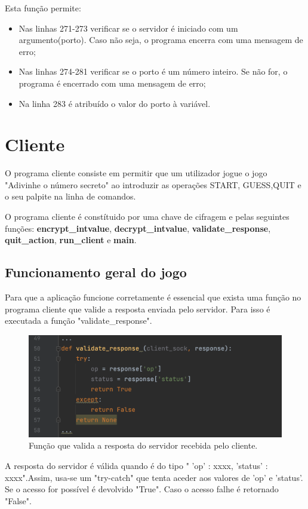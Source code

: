 \documentclass{report}
\begin{document}
Esta função permite:
\begin{itemize}
\item Nas linhas 271-273 verificar se o servidor é iniciado com um argumento(porto). Caso não seja, o programa encerra com uma mensagem de erro;
\item Nas linhas 274-281 verificar se o porto é um número inteiro. Se não for, o programa é encerrado com uma mensagem de erro;
\item Na linha 283 é atribuído o valor do porto à variável.
\end{itemize}

\section{Cliente}
O programa cliente consiste em permitir que um utilizador jogue o jogo "Adivinhe o número secreto" ao introduzir as operações START, GUESS,QUIT e o seu palpite na linha de comandos.

O programa cliente é constítuido por uma chave de cifragem e pelas seguintes funções: \textbf{encrypt\_intvalue}, \textbf{decrypt\_intvalue}, \textbf{validate\_response}, \textbf{quit\_action}, \textbf{run\_client} e \textbf{main}.
\subsection{Funcionamento geral do jogo}
Para que a aplicação funcione corretamente é essencial que exista uma função no programa cliente que valide a resposta enviada pelo servidor. Para isso é executada a função "validate\_response".
\begin{figure}[H]
        \centering
        \includegraphics[scale=0.43]{validateResponse}      
        \caption{Função que valida a resposta do servidor recebida pelo cliente.}
\end{figure}
A resposta do servidor é válida quando é do tipo " 'op' : xxxx, 'status' : xxxx".Assim, usa-se um "try-catch" que tenta aceder aos valores de 'op' e 'status'. Se o acesso for possível é devolvido "True". Caso o acesso falhe é retornado "False".
\end{document}

